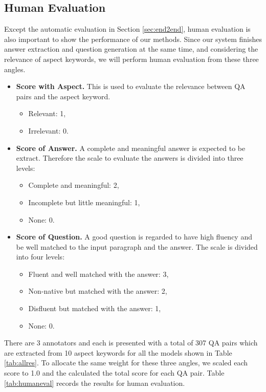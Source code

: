 \subsection{Human Evaluation}
Except the automatic evaluation in Section \ref{sec:end2end}, human evaluation is also important to show the performance of our methods.
Since our system finishes answer extraction and question generation at the same time, and considering the relevance of aspect keywords, we will perform human evaluation from these three angles.
\begin{itemize}
\item \textbf{Score with Aspect.} This is used to evaluate the relevance between QA pairs and the aspect keyword. 
\begin{itemize}
\item Relevant: 1, 
\item Irrelevant: 0.
\end{itemize}
\item \textbf{Score of Answer.} A complete and meaningful answer is expected to be extract. Therefore the scale to evaluate the answers is divided into three levels:
\begin{itemize}
\item Complete and meaningful: 2, 
\item Incomplete but little meaningful: 1, 
\item None: 0.
\end{itemize}
\item \textbf{Score of Question.} A good question is regarded to have high fluency and be well matched to the input paragraph and the answer. The scale is divided into four levels:
\begin{itemize}
\item Fluent and well matched with the answer: 3, 
\item Non-native but matched with the answer: 2, 
\item Disfluent but matched with the answer: 1, 
\item None: 0.
\end{itemize}
\end{itemize}

There are 3 annotators and each is presented with a total of 307 QA pairs which are extracted from 10 aspect keywords for all the models shown in Table \ref{tab:allres}.
To allocate the same weight for these three angles, we scaled each score to 1.0 and the calculated the total score for each QA pair.
Table \ref{tab:humaneval} records the results for human evaluation.

